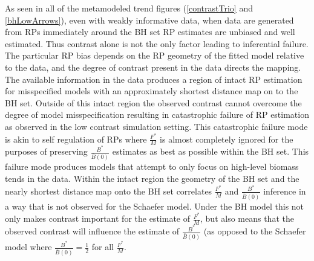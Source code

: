 As seen in all of the metamodeled trend figures (\ref{contrastTrio} and \ref{bhLowArrows}), 
even with weakly informative data, when data are generated from RPs immediately around the BH set %
RP estimates are unbiased and well estimated. Thus contrast 
alone is not the only factor leading to inferential failure. The particular RP 
bias depends on the RP geometry of the fitted model relative to the data, and 
the degree of contrast present in the data directs the mapping. 
The available information in the data produces a region of intact RP estimation 
for misspecified models with an approximately shortest distance map on to the BH set. 
Outside of this intact region the observed contrast cannot overcome the degree 
of model misspecification resulting in catastrophic failure of RP estimation as 
observed in the low contrast simulation setting.  
This catastrophic failure mode is akin to self regulation of RPs where $\frac{F^*}{M}$ 
is almost completely ignored for the purposes of preserving $\frac{B^*}{\bar B(0)}$ 
estimates as best as possible within the BH set. %
This failure mode produces 
models that attempt to only focus on high-level biomass tends in the data.
%
Within the intact region the geometry of the BH set and the nearly shortest distance 
map onto the BH set correlates $\frac{F^*}{M}$ and $\frac{B^*}{\bar B(0)}$ 
inference in a way that is not observed for the Schaefer model.
Under the BH model this not only makes contrast important for the estimate of $\frac{F^*}{M}$, 
but also means that the observed contrast will influence the estimate of 
$\frac{B^*}{\bar B(0)}$ (as opposed to the Schaefer model where $\frac{B^*}{\bar B(0)}=\frac{1}{2}$ for all $\frac{F^*}{M}$. %


